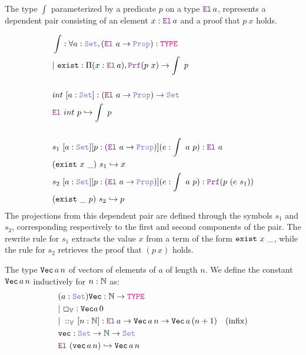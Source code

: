 \begin{definition}\label{dep-pair-def}
The type $\int$ \index{$\int$} parameterized by a predicate $p$ on a type $\el\,a$, represents a dependent pair consisting of an element $x : \el\,a$ and a proof that $p~x$ holds.

\begin{align*}
&\int: \forall a : \set{}, (\el{}~a \ra \prop): \type \\
&|~\kw{exist} : \Pi (x :\el{}\,a), \prf (p~x) \ra \int~p \\
&\\
& int~[a: \set{}]: (\el{}~a \ra \prop) \ra \set{} \\
& \el{}~int~p \re \int~p \\
&\\
& s_1 \index{$s_1$} ~[a: \set{}] [p:(\el{}~a \ra \prop)] (e: \int~a~p): \el{}~a \\
& (\kw{exist}~x~\_)~s_1 \re x\\
& s_2 \index{$s_2$}~[a: \set{}] [p:(\el{}~a \ra \prop)] (e: \int~a~p): \prf{}(p~(e~s_1)) \\
& (\kw{exist}~\_~p)~s_2 \re p\\
\end{align*}
The projections from this dependent pair are defined through the symbols $s_1$ and $s_2$, corresponding respectively to the first and second components of the pair.
The rewrite rule for $s_1$ extracts the value $x$ from a term of the form $\texttt{\upshape{exist}}~x~\_$, while the rule for $s_2$ retrieves the proof that $(p~x)$ holds.
\end{definition}

\begin{definition}\label{def:dependent-vector}
The type \( \texttt{\upshape{Vec}}\,a\,n \)  of vectors of elements of $a$ of length $n$.
We define the constant \( \texttt{\upshape{Vec}}\,a\,n \) inductively for \( n : \mathbb{N} \) as:
\begin{align*}
&(a: \set) \kw{Vec}: \N \ra \type \\
&|~\Box_\bb{V} \index{$\Box_\bb{V}$} : \kw{Vec} a \, 0 \\
&|~\cons_\bb{V} \index{$\cons_\bb{V}$} \,[n:\N]: \el\,a \ra \kw{Vec}\,a\,n \ra  \kw{Vec}\,a\,(n +1) \quad (\text{infix})\\
&\kw{vec}: \set \ra \N \ra \set \\
&\el~(\kw{vec}\,a\,n) \re \kw{Vec}\,a\,n
\end{align*}
\end{definition}

